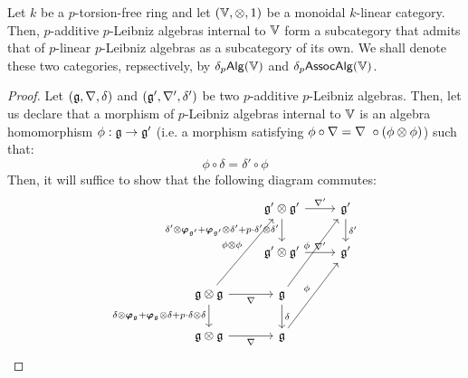                     \begin{claim}
                        Let $k$ be a $p$-torsion-free ring and let $(\V, \tensor, 1)$ be a monoidal $k$-linear category. Then, $p$-additive $p$-Leibniz algebras internal to $\V$ form a subcategory that admits that of $p$-linear $p$-Leibniz algebras as a subcategory of its own. We shall denote these two categories, repsectively, by $\delta_p\Alg(\V)$ and $\delta_p\Assoc\Alg(\V)$.
                    \end{claim}
                        \begin{proof}
                            Let $(\g, \nabla, \delta)$ and $(\g', \nabla', \delta')$ be two $p$-additive $p$-Leibniz algebras. Then, let us declare that a morphism of $p$-Leibniz algebras internal to $\V$ is an algebra homomorphism $\phi: \g \to \g'$ (i.e. a morphism satisfying $\phi \circ \nabla = \nabla\ \circ (\phi \tensor \phi)$) such that:
                                $$\phi \circ \delta = \delta' \circ \phi$$
                            Then, it will suffice to show that the following diagram commutes:
                                $$
                                    \begin{tikzcd}
                                    	& {\g' \tensor \g'} & {\g'} \\
                                    	& {\g' \tensor \g'} & {\g'} \\
                                    	{\g \tensor \g} & {\g} \\
                                    	{\g \tensor \g} & {\g}
                                    	\arrow["{\phi \tensor \phi}", from=3-1, to=1-2]
                                    	\arrow["{\phi}", from=3-2, to=1-3]
                                    	\arrow["{\phi}", from=4-2, to=2-3]
                                    	\arrow["{\delta'}", from=1-3, to=2-3]
                                    	\arrow["{\nabla'}", from=1-2, to=1-3]
                                    	\arrow["{\delta' \tensor \Frob_{\g'} + \Frob_{\g'} \tensor \delta' + p \cdot \delta' \tensor \delta'}"', from=1-2, to=2-2]
                                    	\arrow["{\nabla'}", from=2-2, to=2-3]
                                    	\arrow["{\delta}", from=3-2, to=4-2]
                                    	\arrow["{\delta \tensor \Frob_{\g} + \Frob_{\g} \tensor \delta + p \cdot \delta \tensor \delta}"', from=3-1, to=4-1]
                                    	\arrow["{\nabla}"', from=4-1, to=4-2]
                                    	\arrow["{\nabla}"', from=3-1, to=3-2]

\end{tikzcd}$$
\end{proof}
